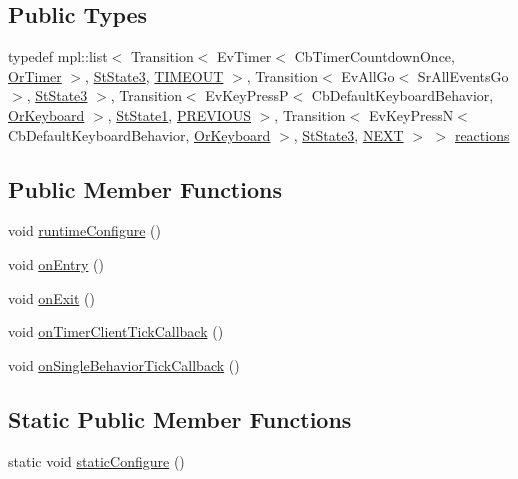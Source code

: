 \subsection*{Public Types}
\begin{DoxyCompactItemize}
\item 
typedef mpl\+::list$<$ Transition$<$ Ev\+Timer$<$ Cb\+Timer\+Countdown\+Once, \hyperlink{classsm__starcraft__ai_1_1OrTimer}{Or\+Timer} $>$, \hyperlink{structsm__starcraft__ai_1_1StState3}{St\+State3}, \hyperlink{structsm__starcraft__ai_1_1StState2_1_1TIMEOUT}{T\+I\+M\+E\+O\+UT} $>$, Transition$<$ Ev\+All\+Go$<$ Sr\+All\+Events\+Go $>$, \hyperlink{structsm__starcraft__ai_1_1StState3}{St\+State3} $>$, Transition$<$ Ev\+Key\+PressP$<$ Cb\+Default\+Keyboard\+Behavior, \hyperlink{classsm__starcraft__ai_1_1OrKeyboard}{Or\+Keyboard} $>$, \hyperlink{structsm__starcraft__ai_1_1StState1}{St\+State1}, \hyperlink{structsm__starcraft__ai_1_1StState2_1_1PREVIOUS}{P\+R\+E\+V\+I\+O\+US} $>$, Transition$<$ Ev\+Key\+PressN$<$ Cb\+Default\+Keyboard\+Behavior, \hyperlink{classsm__starcraft__ai_1_1OrKeyboard}{Or\+Keyboard} $>$, \hyperlink{structsm__starcraft__ai_1_1StState3}{St\+State3}, \hyperlink{structsm__starcraft__ai_1_1StState2_1_1NEXT}{N\+E\+XT} $>$ $>$ \hyperlink{structsm__starcraft__ai_1_1StState2_a90bc8036f232c8223d573adfdce964a8}{reactions}
\end{DoxyCompactItemize}
\subsection*{Public Member Functions}
\begin{DoxyCompactItemize}
\item 
void \hyperlink{structsm__starcraft__ai_1_1StState2_ad5b1a7cab66440e5e54f353109636d25}{runtime\+Configure} ()
\item 
void \hyperlink{structsm__starcraft__ai_1_1StState2_a76587bab7001901f5a101acd07fe4382}{on\+Entry} ()
\item 
void \hyperlink{structsm__starcraft__ai_1_1StState2_a99d165b2f2fde452860cce184d4cdb4b}{on\+Exit} ()
\item 
void \hyperlink{structsm__starcraft__ai_1_1StState2_a25cb07224e7b042ae94217a72d2fa930}{on\+Timer\+Client\+Tick\+Callback} ()
\item 
void \hyperlink{structsm__starcraft__ai_1_1StState2_a5c533c81fd35f6dbd887612055ac085b}{on\+Single\+Behavior\+Tick\+Callback} ()
\end{DoxyCompactItemize}
\subsection*{Static Public Member Functions}
\begin{DoxyCompactItemize}
\item 
static void \hyperlink{structsm__starcraft__ai_1_1StState2_aba0661f077c6fc4cb428b7c21b0655ad}{static\+Configure} ()
\end{DoxyCompactItemize}
